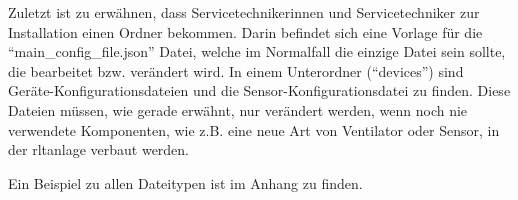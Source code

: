 Zuletzt ist zu erwähnen, dass Servicetechnikerinnen und Servicetechniker zur Installation einen Ordner bekommen. Darin befindet sich eine Vorlage für die \enquote{main\_config\_file.json} Datei, welche im Normalfall die einzige Datei sein sollte, die bearbeitet bzw. verändert wird.
In einem Unterordner (\enquote{devices}) sind Geräte-Konfigurationsdateien und die Sensor-Konfigurationsdatei zu finden. Diese Dateien müssen, wie gerade erwähnt, nur verändert werden, wenn noch nie verwendete Komponenten, wie z.B. eine neue Art von Ventilator oder Sensor, in der \acs{rltanlage} verbaut werden.

Ein Beispiel zu allen Dateitypen ist im Anhang zu finden.




